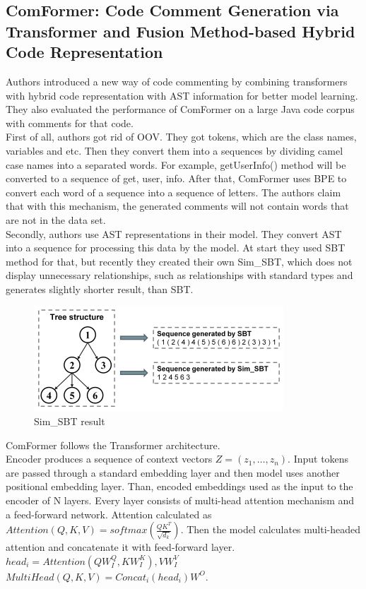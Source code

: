 \documentclass{article}
\begin{document}
\subsection{ComFormer: Code Comment Generation via Transformer and Fusion Method-based Hybrid Code Representation}
Authors introduced a new way of code commenting by combining transformers with hybrid code representation with AST information for better model learning.
They also evaluated the performance of ComFormer \cite{comformertoken} on a large Java code corpus with comments for that code.\\
First of all, authors got rid of OOV. They got tokens, which are the class names, variables and etc. Then they convert them into a sequences by dividing camel case names into a separated words. For example, getUserInfo() method will be converted to a sequence of get, user, info. After that, ComFormer uses BPE to convert each word of a sequence into a sequence of letters. The authors claim that with this mechanism, the generated comments will not contain words that are not in the data set.\\
Secondly, authors use AST representations in their model. They convert AST into a sequence for processing this data by the model. At start they used SBT method for that, but recently they created their own Sim\_SBT, which does not display unnecessary relationships, such as relationships with standard types and generates slightly shorter result, than SBT.
\begin{figure}[!tbh]
    \centering
    \includegraphics[width=1.0\linewidth]{sim-sbt.png}
    \caption{Sim\_SBT result}
    \label{fig:sim-sbt}
\end{figure}
ComFormer follows the Transformer architecture.\\
Encoder produces a sequence of context vectors $Z=(z_1,\dots,z_n)$. Input tokens are
passed through a standard embedding layer and then model uses another positional embedding layer. Than, encoded embeddings used as the input to the encoder of N layers. Every layer consists of multi-head attention mechanism and a feed-forward network. Attention calculated as $Attention(Q,K,V) = softmax(\frac{QK^{T}}{\sqrt{d_k}})$. Then the model calculates multi-headed attention and concatenate it with feed-forward layer.\\ $head_i = Attention(QW_{I}^Q, KW_{I}^K),VW_{I}^V$\\ $MultiHead(Q,K,V) = Concat_i(head_i)W^O$.\\\\
\end{document}
